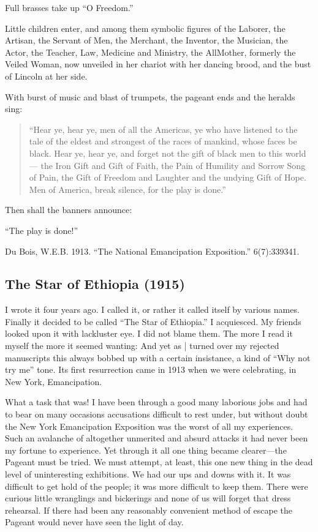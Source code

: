 \documentclass[letterpaper,10pt,english]{jupyterBook}
\begin{document}
\sphinxAtStartPar
Full brasses take up “O Freedom.”

\sphinxAtStartPar
Little children enter, and among them symbolic figures of the Laborer, the Artisan, the Servant of Men, the Merchant, the Inventor, the Musician, the Actor, the Teacher, Law, Medicine and Ministry, the All\sphinxhyphen{}Mother, formerly the Veiled Woman, now unveiled in her chariot with her dancing brood, and the bust of Lincoln at her side.

\sphinxAtStartPar
With burst of music and blast of trumpets, the pageant ends and the heralds sing:
\begin{quote}

\sphinxAtStartPar
“Hear ye, hear ye, men of all the Americas, ye who have listened to the tale of the eldest and strongest of the races of mankind, whose faces be black. Hear ye, hear ye, and forget not the gift of black men to this world— the Iron Gift and Gift of Faith, the Pain of Humility and Sorrow Song of Pain, the Gift of Freedom and Laughter and the undying Gift of Hope. Men of America, break silence, for the play is done.”
\end{quote}

\sphinxAtStartPar
Then shall the banners announce:

\sphinxAtStartPar
“The play is done!”

\sphinxAtStartPar
{} Du Bois, W.E.B. 1913. “The National Emancipation Exposition.”  6(7):339\sphinxhyphen{}341.


\subsection{The Star of Ethiopia (1915)}
\label{\detokenize{Volumes/11/02/star_of_ethiopia:the-star-of-ethiopia-1915}}\label{\detokenize{Volumes/11/02/star_of_ethiopia::doc}}
\sphinxAtStartPar
I wrote it four years ago. I called it, or rather it called itself by various names. Finally it decided to be called “The Star of Ethiopia.” I acquiesced. My friends looked upon it with lack\sphinxhyphen{}luster eye. I did not blame them. The more I read it myself the more it seemed wanting: And yet as | turned over my rejected manuscripts this always bobbed up with a certain insistance, a kind of “Why not try me” tone. Its first resurrection came in 1913 when we were celebrating, in New York, Emancipation.

\sphinxAtStartPar
What a task that was! I have been through a good many laborious jobs and had to bear on many occasions accusations difficult to rest under, but without doubt the New York Emancipation Exposition was the worst of all my experiences. Such an avalanche of altogether unmerited and absurd attacks it had never been my fortune to experience. Yet through it all one thing became clearer—the Pageant must be tried. We must attempt, at least, this one new thing in the dead level of uninteresting exhibitions. We had our ups and downs with it. It was difficult to get hold of the people; it was more difficult to keep them. There were curious little wranglings and bickerings and none of us will forget that dress rehearsal. If there had been any reasonably convenient method of escape the Pageant would never have seen the light of day.
\end{document}
